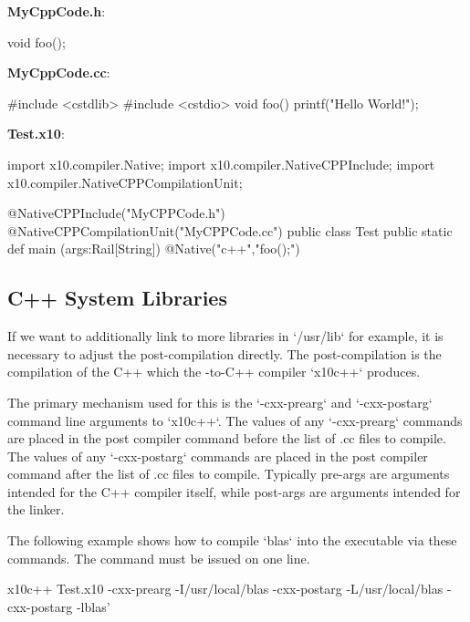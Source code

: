 {\bf MyCppCode.h}: 
\begin{xten}
void foo();
\end{xten}


{\bf MyCppCode.cc}:
\begin{xten}
#include <cstdlib>
#include <cstdio>
void foo() {
    printf("Hello World!\n");
}
\end{xten}

{\bf Test.x10}:
\begin{xten}
import x10.compiler.Native;
import x10.compiler.NativeCPPInclude;
import x10.compiler.NativeCPPCompilationUnit;

@NativeCPPInclude("MyCPPCode.h")
@NativeCPPCompilationUnit("MyCPPCode.cc")
public class Test {
    public static def main (args:Rail[String]) {
        { @Native("c++","foo();") {} }
    }
}
\end{xten}

\subsection{C++ System Libraries}

If we want to additionally link to more libraries in \xcd`/usr/lib` for
example, it is necessary to adjust the post-compilation directly.  The
post-compilation is the compilation of the C++ which the \Xten{}-to-C++ compiler
\xcd`x10c++` produces.  

The primary mechanism used for this is the \xcd`-cxx-prearg` and
\xcd`-cxx-postarg` command line arguments to
\xcd`x10c++`. The values of any \xcd`-cxx-prearg` commands are placed
in the post compiler command before the list of .cc files to compile.
The values of any \xcd`-cxx-postarg` commands are placed in the post
compiler command after the list of .cc files to compile. Typically
pre-args are arguments intended for the C++ compiler itself, while
post-args are arguments intended for the linker. 

The following example shows how to compile \xcd`blas` into the
executable via these commands. The command must be issued on one line.

\begin{xten}
x10c++ Test.x10 -cxx-prearg -I/usr/local/blas 
  -cxx-postarg -L/usr/local/blas -cxx-postarg -lblas'
\end{xten}

